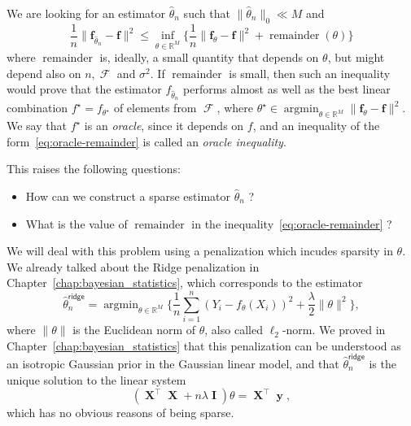 \documentclass[
	fontsize=11pt, %
	twoside=false, %
	numbers=noenddot, %
]{kaobook}
\DeclareMathOperator{\cF}{{\mathcal F}}
\DeclareMathOperator{\bI}{{\boldsymbol I}}
\DeclareMathOperator{\bX}{{\boldsymbol X}}
\renewcommand{\bf}{{\boldsymbol f}}
\DeclareMathOperator{\by}{{\boldsymbol y}}
\DeclareMathOperator{\remain}{remainder}
\DeclareMathOperator*{\argmin}{argmin}
\newcommand{\R}{\mathbb R}
\newcommand{\wh}{\widehat}
\newcommand{\norm}[1]{\| #1 \|}
\begin{document}
We are looking for an estimator $\wh \theta_n$ such that $\norm{\wh \theta_n}_0 \ll M$ and
\begin{equation}
	\label{eq:oracle-remainder}
	\frac 1n \norm{\bf_{\wh \theta_n} - \bf}^2 
	\leq \inf_{\theta \in \R^M} \Big\{ 
	\frac 1n  \norm{\bf_\theta - \bf}^2 + \remain(\theta) \Big\}
\end{equation}
where $\remain$ is, ideally, a small quantity that depends on $\theta$, but might depend also on $n, \cF$ and $\sigma^2$.
If $\remain$ is small, then such an inequality would prove that the estimator $f_{\wh \theta_n}$ performs almost as well as the best linear combination $f^\star = f_{\theta^\star}$ of elements from $\cF$, where $\theta^\star \in \argmin_{\theta \in \R^M} \norm{\bf_\theta - \bf}^2$.
We say that $f^\star$ is an \emph{oracle}, since it depends on $f$, and an inequality of the form~\eqref{eq:oracle-remainder} is called an \emph{oracle inequality}.

This raises the following questions:
\begin{itemize}
	\item How can we construct a sparse estimator $\wh \theta_n$ ?
	\item What is the value of $\remain$ in the inequality~\eqref{eq:oracle-remainder} ?
\end{itemize}
We will deal with this problem using a penalization which incudes sparsity in $\theta$.
We already talked about the Ridge penalization in Chapter~\ref{chap:bayesian_statistics}, which corresponds to the estimator
\begin{equation}
	\label{eq:chap-lasso-ridge-estimator}
	\wh \theta_n^{\mathsf{ridge}} = \argmin_{\theta \in \R^M} 
	\Big\{ \frac 1n \sum_{i=1}^n (Y_i - f_\theta(X_i))^2 + \frac{\lambda}{2} \norm{\theta}^2 \Big\},
\end{equation}
where $\norm{\theta}$ is the Euclidean norm of $\theta$, also called $\ell_2$-norm.
We proved in Chapter~\ref{chap:bayesian_statistics} that this penalization can be understood as an isotropic Gaussian prior in the Gaussian linear model, and that $\wh \theta_n^{\mathsf{ridge}}$ is the unique solution to the linear system
\begin{equation*}
	(\bX^\top \bX + n \lambda \bI) \theta = \bX^\top \by,
\end{equation*}
which has no obvious reasons of being sparse.
\end{document}
